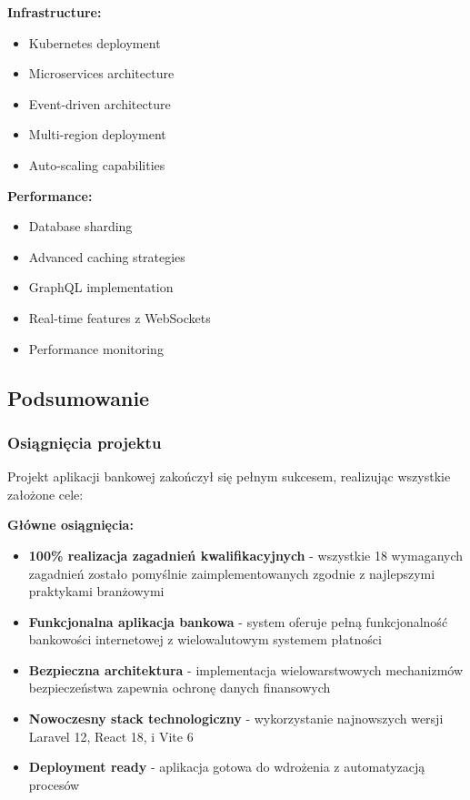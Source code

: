 \documentclass[12pt,a4paper]{article}
\begin{document}
    \textbf{Infrastructure:}
    \begin{itemize}
        \item Kubernetes deployment
        \item Microservices architecture
        \item Event-driven architecture
        \item Multi-region deployment
        \item Auto-scaling capabilities
    \end{itemize}

    \textbf{Performance:}
    \begin{itemize}
        \item Database sharding
        \item Advanced caching strategies
        \item GraphQL implementation
        \item Real-time features z WebSockets
        \item Performance monitoring
    \end{itemize}

    \subsection{Podsumowanie}

    \subsubsection{Osiągnięcia projektu}

    Projekt aplikacji bankowej zakończył się pełnym sukcesem, realizując wszystkie założone cele:

    \textbf{Główne osiągnięcia:}
    \begin{itemize}
        \item \textbf{100\% realizacja zagadnień kwalifikacyjnych} - wszystkie 18 wymaganych zagadnień zostało pomyślnie zaimplementowanych zgodnie z najlepszymi praktykami branżowymi
        \item \textbf{Funkcjonalna aplikacja bankowa} - system oferuje pełną funkcjonalność bankowości internetowej z wielowalutowym systemem płatności
        \item \textbf{Bezpieczna architektura} - implementacja wielowarstwowych mechanizmów bezpieczeństwa zapewnia ochronę danych finansowych
        \item \textbf{Nowoczesny stack technologiczny} - wykorzystanie najnowszych wersji Laravel 12, React 18, i Vite 6
        \item \textbf{Deployment ready} - aplikacja gotowa do wdrożenia z automatyzacją procesów
    \end{itemize}
\end{document}
